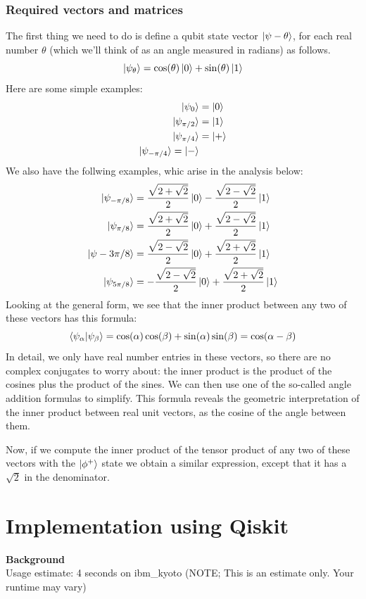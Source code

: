 \subsubsection{Required vectors and matrices}
The first thing we need to do is define a qubit state vector $\ket{\psi-{\theta}}$, for each real number $\theta$ (which we'll think of as an angle measured in radians) as follows.
\[
\ket{\psi_{\theta}} = \cos(\theta)\ket{0} + \sin(\theta)\ket{1}
\]
Here are some simple examples:
\begin{align*}
    \ket{\psi_0} &= \ket{0}\\
    \ket{\psi_{\pi/2}}&=\ket{1}\\
    \ket{\psi_{\pi/4}} &=\ket{+}\\
    \ket{\psi_{-\pi/4}} =\ket{-}
\end{align*}
We also have the follwing examples, whic arise in the analysis below:
\begin{align*}
    \ket{\psi_{-\pi/8}} &= \frac{\sqrt{2+\sqrt{2}}}{2}\ket{0}-\frac{\sqrt{2-\sqrt{2}}}{2}\ket{1}\\
    \ket{\psi_{\pi/8}} &= \frac{\sqrt{2+\sqrt{2}}}{2}\ket{0}+\frac{\sqrt{2-\sqrt{2}}}{2}\ket{1}\\
    \ket{\psi-{3\pi/8}} &=\frac{\sqrt{2-\sqrt{2}}}{2}\ket{0} + \frac{\sqrt{2+\sqrt{2}}}{2}\ket{1}\\
    \ket{\psi_{5\pi/8}} &= -\frac{\sqrt{2-\sqrt{2}}}{2}\ket{0} + \frac{\sqrt{2+\sqrt{2}}}{2} \ket{1}
\end{align*}
Looking at the general form, we see that the inner product between any two of these vectors has this formula:
\[
\braket{\psi_{\alpha}|\psi_{\beta}} =\cos(\alpha) \cos(\beta) + \sin(\alpha)\sin(\beta) = \cos(\alpha-\beta)
\]
In detail, we only have real number entries in these vectors, so there are no complex conjugates to worry about: the inner product is the product of the cosines plus the product of the sines. We can then use one of the so-called angle addition formulas to simplify. This formula reveals the geometric interpretation of the inner product between real unit vectors, as the cosine of the angle between them.

Now, if we compute the inner product of the tensor product of any two of these vectors with the $\ket{\phi^+}$ state we obtain a similar expression, except that it has a $\sqrt{2}$ in the denominator.

\section{Implementation using Qiskit}
\textbf{Background}\\
Usage estimate: 4 seconds on ibm\_kyoto (NOTE; This is an estimate only. Your runtime may
vary)

